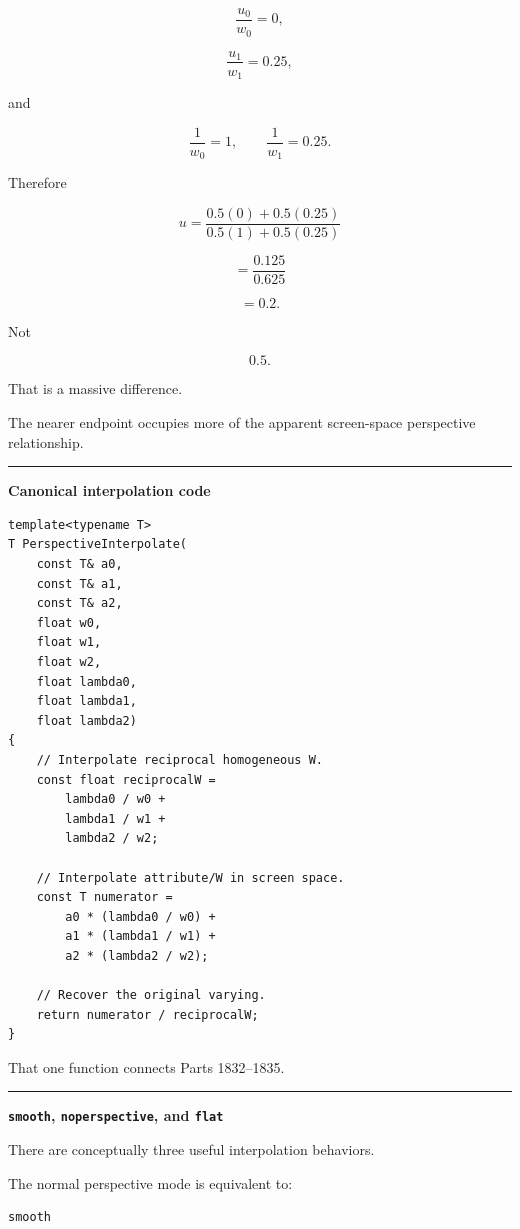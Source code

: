 \[
\frac{u_0}{w_0}=0,
\]

\[
\frac{u_1}{w_1}=0.25,
\]

and

\[
\frac1{w_0}=1,\qquad
\frac1{w_1}=0.25.
\]

Therefore

\[
u=
\frac{
0.5(0)+0.5(0.25)
}{
0.5(1)+0.5(0.25)
}
\]

\[
=
\frac{0.125}{0.625}
\]

\[
=
0.2.
\]

Not

\[
0.5.
\]

That is a massive difference.

The nearer endpoint occupies more of the apparent screen-space perspective relationship.

\begin{center}\rule{0.5\linewidth}{0.5pt}\end{center}

\textbf{Canonical interpolation code}

\begin{verbatim}
template<typename T>
T PerspectiveInterpolate(
    const T& a0,
    const T& a1,
    const T& a2,
    float w0,
    float w1,
    float w2,
    float lambda0,
    float lambda1,
    float lambda2)
{
    // Interpolate reciprocal homogeneous W.
    const float reciprocalW =
        lambda0 / w0 +
        lambda1 / w1 +
        lambda2 / w2;

    // Interpolate attribute/W in screen space.
    const T numerator =
        a0 * (lambda0 / w0) +
        a1 * (lambda1 / w1) +
        a2 * (lambda2 / w2);

    // Recover the original varying.
    return numerator / reciprocalW;
}
\end{verbatim}

That one function connects Parts 1832--1835.

\begin{center}\rule{0.5\linewidth}{0.5pt}\end{center}

\textbf{\texttt{smooth}, \texttt{noperspective}, and \texttt{flat}}

There are conceptually three useful interpolation behaviors.

The normal perspective mode is equivalent to:

\begin{verbatim}
smooth
\end{verbatim}

